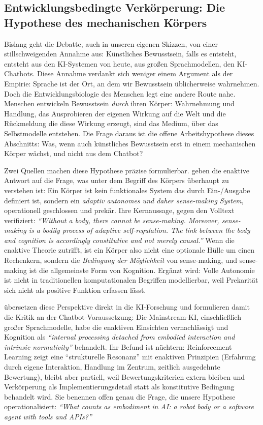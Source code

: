 \documentclass[acmlarge, noacm]{acmart}
\begin{document}
\subsection{Entwicklungsbedingte Verkörperung: Die Hypothese des mechanischen Körpers \cite{dipaolothompson2024,rafieesutton2026}}

Bislang geht die Debatte, auch in unseren eigenen Skizzen, von einer stillschweigenden Annahme aus: Künstliches Bewusstsein, falls es entsteht, entsteht aus den KI-Systemen von heute, aus großen Sprachmodellen, den KI-Chatbots. Diese Annahme verdankt sich weniger einem Argument als der Empirie: Sprache ist der Ort, an dem wir Bewusstsein üblicherweise wahrnehmen. Doch die Entwicklungsbiologie des Menschen legt eine andere Route nahe. Menschen entwickeln Bewusstsein \textit{durch} ihren Körper: Wahrnehmung und Handlung, das Ausprobieren der eigenen Wirkung auf die Welt und die Rückmeldung die diese Wirkung erzeugt, sind das Medium, über das Selbstmodelle entstehen. Die Frage daraus ist die offene Arbeitshypothese dieses Abschnitts: Was, wenn auch künstliches Bewusstsein erst in einem mechanischen Körper wächst, und nicht aus dem Chatbot?

Zwei Quellen machen diese Hypothese präzise formulierbar. \citet{dipaolothompson2024} geben die enaktive Antwort auf die Frage, was unter dem Begriff des Körpers überhaupt zu verstehen ist: Ein Körper ist kein funktionales System das durch Ein-/Ausgabe definiert ist, sondern ein \textit{adaptiv autonomes und daher sense-making System}, operationell geschlossen und prekär. Ihre Kernaussage, gegen den Volltext verifiziert: \textit{``Without a body, there cannot be sense-making. Moreover, sense-making is a bodily process of adaptive self-regulation. The link between the body and cognition is accordingly constitutive and not merely causal.''} Wenn die enaktive Theorie zutrifft, ist ein Körper also nicht eine optionale Hülle um einen Rechenkern, sondern die \textit{Bedingung der Möglichkeit} von sense-making, und sense-making ist die allgemeinste Form von Kognition. Ergänzt wird: Volle Autonomie ist nicht in traditionellen komputationalen Begriffen modellierbar, weil Prekarität sich nicht als positive Funktion erfassen lässt.

\citet{rafieesutton2026} übersetzen diese Perspektive direkt in die KI-Forschung und formulieren damit die Kritik an der Chatbot-Voraussetzung: Die Mainstream-KI, einschließlich großer Sprachmodelle, habe die enaktiven Einsichten vernachlässigt und Kognition als \textit{``internal processing detached from embodied interaction and intrinsic normativity''} behandelt. Ihr Befund ist nüchtern: Reinforcement Learning zeigt eine ``strukturelle Resonanz'' mit enaktiven Prinzipien (Erfahrung durch eigene Interaktion, Handlung im Zentrum, zeitlich ausgedehnte Bewertung), bleibt aber partiell, weil Bewertungskriterien extern bleiben und Verkörperung als Implementierungsdetail statt als konstitutive Bedingung behandelt wird. Sie benennen offen genau die Frage, die unsere Hypothese operationalisiert: \textit{``What counts as embodiment in AI: a robot body or a software agent with tools and APIs?''}
\end{document}
